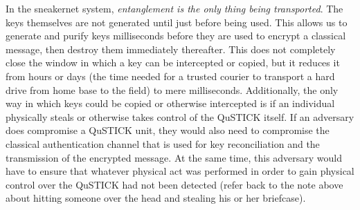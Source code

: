 \documentclass[aps,prl,twocolumn,10pt,nofootinbib]{revtex4}
\begin{document}
In the sneakernet system, {\em entanglement is the only thing being transported}.  The keys themselves are not generated until just before being used.  This allows us to generate and purify keys milliseconds before they are used to encrypt a classical message, then destroy them immediately thereafter.  This does not completely close the window in which a key can be intercepted or copied, but it reduces it from hours or days (the time needed for a trusted courier to transport a hard drive from home base to the field) to mere milliseconds.  Additionally, the only way in which keys could be copied or otherwise intercepted is if an individual physically steals or otherwise takes control of the QuSTICK itself.  If an adversary does compromise a QuSTICK unit, they would also need to compromise the classical authentication channel that is used for key reconciliation and the transmission of the encrypted message.  At the same time, this adversary would have to ensure that whatever physical act was performed in order to gain physical control over the QuSTICK had not been detected (refer back to the note above about hitting someone over the head and stealing his or her briefcase).    
\end{document}
